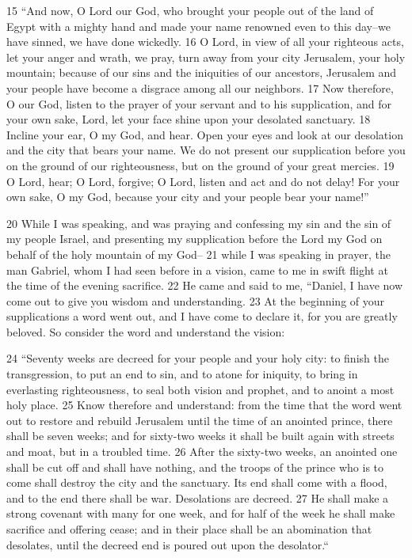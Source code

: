 15 ``And now, O Lord our God, who brought your people out of the land of Egypt 
with a mighty hand and made your name renowned even to this day--we have sinned, 
we have done wickedly. 16 O Lord, in view of all your righteous acts, let your 
anger and wrath, we pray, turn away from your city Jerusalem, your holy 
mountain; because of our sins and the iniquities of our ancestors, Jerusalem and 
your people have become a disgrace among all our neighbors. 17 Now therefore, O 
our God, listen to the prayer of your servant and to his supplication, and for 
your own sake, Lord, let your face shine upon your desolated sanctuary. 18 
Incline your ear, O my God, and hear. Open your eyes and look at our desolation 
and the city that bears your name. We do not present our supplication before 
you on the ground of our righteousness, but on the ground of your great mercies.
19 O Lord, hear; O Lord, forgive; O Lord, listen and act and do not delay! For 
your own sake, O my God, because your city and your people bear your name!''

20 While I was speaking, and was praying and confessing my sin and the sin of my 
people Israel, and presenting my supplication before the Lord my God on behalf 
of the holy mountain of my God-- 21 while I was speaking in prayer, the man 
Gabriel, whom I had seen before in a vision, came to me in swift flight at the 
time of the evening sacrifice. 22 He came and said to me, ``Daniel, I have now 
come out to give you wisdom and understanding. 23 At the beginning of your 
supplications a word went out, and I have come to declare it, for you are 
greatly beloved. So consider the word and understand the vision:

24 ``Seventy weeks are decreed for your people and your holy city: to finish 
the transgression, to put an end to sin, and to atone for iniquity, to bring in 
everlasting righteousness, to seal both vision and prophet, and to anoint a most 
holy place. 25 Know therefore and understand: from the time that the word went 
out to restore and rebuild Jerusalem until the time of an anointed prince, 
there shall be seven weeks; and for sixty-two weeks it shall be built again with 
streets and moat, but in a troubled time. 26 After the sixty-two weeks, an 
anointed one shall be cut off and shall have nothing, and the troops of the 
prince who is to come shall destroy the city and the sanctuary. Its end shall 
come with a flood, and to the end there shall be war. Desolations are decreed.
27 He shall make a strong covenant with many for one week, and for half of the 
week he shall make sacrifice and offering cease; and in their place shall be an 
abomination that desolates, until the decreed end is poured out upon the 
desolator.``
